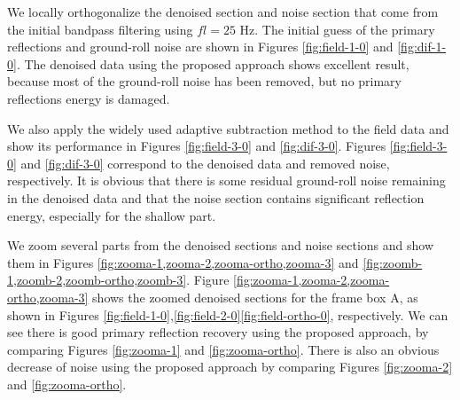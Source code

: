  We locally orthogonalize the denoised section and noise section that come from the initial bandpass filtering using $fl=25$ Hz. The initial guess of the primary reflections and ground-roll noise are shown in Figures \ref{fig:field-1-0} and \ref{fig:dif-1-0}.  The denoised data using the proposed approach shows excellent result, because most of the ground-roll noise has been removed, but no primary reflections energy is damaged. 

We also apply the widely used adaptive subtraction method to the field data and show its performance in Figures \ref{fig:field-3-0} and \ref{fig:dif-3-0}. Figures \ref{fig:field-3-0} and \ref{fig:dif-3-0} correspond to the denoised data and removed noise, respectively. It is obvious that there is some residual ground-roll noise remaining in the denoised data and that the noise section contains significant reflection energy, especially for the shallow part.

We zoom several parts from the denoised sections and noise sections and show them in Figures \ref{fig:zooma-1,zooma-2,zooma-ortho,zooma-3} and \ref{fig:zoomb-1,zoomb-2,zoomb-ortho,zoomb-3}. Figure \ref{fig:zooma-1,zooma-2,zooma-ortho,zooma-3} shows the zoomed denoised sections for the frame box A, as shown in Figures \ref{fig:field-1-0},\ref{fig:field-2-0}\wen{, }\ref{fig:field-ortho-0},  respectively. We can see there is good primary reflection recovery using the proposed approach, by comparing Figures \ref{fig:zooma-1} and \ref{fig:zooma-ortho}. There is also an obvious decrease of noise using the proposed approach by comparing Figures \ref{fig:zooma-2} and \ref{fig:zooma-ortho}. 

